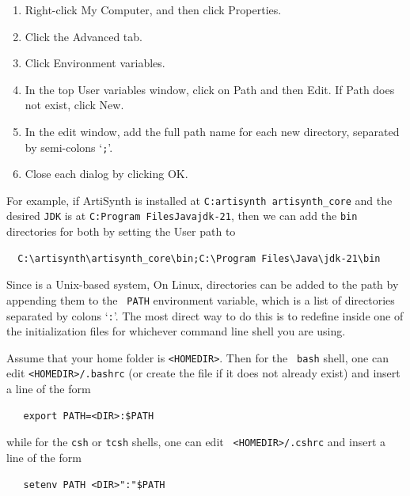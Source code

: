 \begin{enumerate}

\item Right-click {\sf My Computer}, and then click {\sf Properties}.

\item Click the {\sf Advanced} tab.

\item Click {\sf Environment variables}.

\item In the top {\sf User variables} window, click on {\sf Path} and 
then {\sf Edit}. If {\sf Path} does not exist, click {\sf New}.

\item In the edit window, add the full path name for each new directory,
separated by semi-colons `{\tt ;}'.

\item Close each dialog by clicking {\sf OK}.

\end{enumerate}

For example, if ArtiSynth is installed at {\tt C:\BKS artisynth\BKS
artisynth\_core} and the desired {\tt JDK} is at {\tt C:\BKS Program
Files\BKS Java\BKS jdk-21}, then we can add the {\tt bin}
directories for both by setting the User path to
\begin{verbatim}
  C:\artisynth\artisynth_core\bin;C:\Program Files\Java\jdk-21\bin
\end{verbatim}

\fi %

\ifWindows\else %

\ifMacOS
Since \SYSTEM{} is a Unix-based system, 
\else\ifLinux
On Linux,
\fi %
\fi %
directories can be added to the path by appending them to the {\tt
PATH} environment variable, which is a list of directories separated
by colons `{\tt :}'. The most direct way to do this is to redefine
\PATH{} inside one of the initialization files for whichever
command line shell you are using.

Assume that your home folder is {\tt <HOMEDIR>}. Then for the {\tt
bash} shell, one can edit {\tt <HOMEDIR>/.bashrc} (or create the file
if it does not already exist) and insert a line of the form
\begin{verbatim}
   export PATH=<DIR>:$PATH
\end{verbatim}
while for the {\tt csh} or {\tt tcsh} shells, one can edit {\tt
<HOMEDIR>/.cshrc} and insert a line of the form
\begin{verbatim}
   setenv PATH <DIR>":"$PATH
\end{verbatim}

